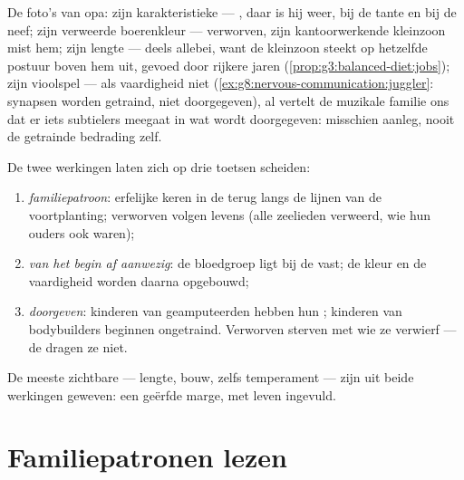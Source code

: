 \begin{example}\label{ex:g9:heredity-and-traits:album}
De foto's van opa: zijn karakteristieke  --- ,
daar is hij weer, bij de tante en bij de neef; zijn verweerde
boerenkleur --- verworven, zijn kantoorwerkende kleinzoon
mist hem; zijn lengte --- deels allebei, want de kleinzoon
steekt op hetzelfde postuur boven hem uit, gevoed door
rijkere jaren (\cref{prop:g3:balanced-diet:jobs}); zijn
vioolspel --- als vaardigheid niet 
(\cref{ex:g8:nervous-communication:juggler}: synapsen worden
getraind, niet doorgegeven), al vertelt de muzikale familie
ons dat er iets subtielers meegaat in wat wordt doorgegeven:
misschien aanleg, nooit de getrainde bedrading zelf.
\end{example}

\begin{proposition}\label{prop:g9:heredity-and-traits:sorting}
De twee werkingen laten zich op drie toetsen scheiden:
\begin{enumerate}
  \item \emph{familiepatroon}: erfelijke  keren in de
         terug langs de lijnen van de voortplanting;
        verworven  volgen levens (alle zeelieden
        verweerd, wie hun ouders ook waren);
  \item \emph{van het begin af aanwezig}: de bloedgroep ligt
        bij de  vast; de kleur en de vaardigheid
        worden daarna opgebouwd;
  \item \emph{doorgeven}: kinderen van geamputeerden hebben
        hun ; kinderen van bodybuilders beginnen
        ongetraind. Verworven  sterven met wie ze
        verwierf --- de  dragen ze niet.
\end{enumerate}
De meeste zichtbare  --- lengte, bouw, zelfs
temperament --- zijn uit beide werkingen geweven: een geërfde
marge, met leven ingevuld.
\end{proposition}
\admitted

\section{Familiepatronen lezen}

